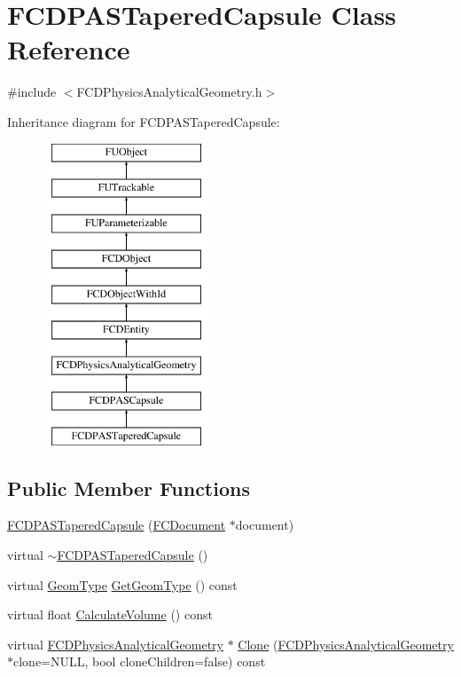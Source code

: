 \hypertarget{classFCDPASTaperedCapsule}{
\section{FCDPASTaperedCapsule Class Reference}
\label{classFCDPASTaperedCapsule}
}


{\ttfamily \#include $<$FCDPhysicsAnalyticalGeometry.h$>$}

Inheritance diagram for FCDPASTaperedCapsule:\begin{figure}[H]
\begin{center}
\leavevmode
\includegraphics[height=9.000000cm]{classFCDPASTaperedCapsule}
\end{center}
\end{figure}
\subsection*{Public Member Functions}
\begin{DoxyCompactItemize}
\item 
\hyperlink{classFCDPASTaperedCapsule_a5a5a7657f504e57f0f5ca6ed18e3ceb7}{FCDPASTaperedCapsule} (\hyperlink{classFCDocument}{FCDocument} $\ast$document)
\item 
virtual \hyperlink{classFCDPASTaperedCapsule_a20a5ff1a3168a6fecdbafd3edba1ab8c}{$\sim$FCDPASTaperedCapsule} ()
\item 
virtual \hyperlink{classFCDPhysicsAnalyticalGeometry_a511583406e5c6a1bb5bd84c0453a452c}{GeomType} \hyperlink{classFCDPASTaperedCapsule_aa971c4fe9208c0c5c1155b6ed8cd03a2}{GetGeomType} () const 
\item 
virtual float \hyperlink{classFCDPASTaperedCapsule_a4406ed34a211191bd43cc7aa4503f9db}{CalculateVolume} () const 
\item 
virtual \hyperlink{classFCDPhysicsAnalyticalGeometry}{FCDPhysicsAnalyticalGeometry} $\ast$ \hyperlink{classFCDPASTaperedCapsule_a102c149935a10a7af1f77f7a0a76649a}{Clone} (\hyperlink{classFCDPhysicsAnalyticalGeometry}{FCDPhysicsAnalyticalGeometry} $\ast$clone=NULL, bool cloneChildren=false) const 
\end{DoxyCompactItemize}
